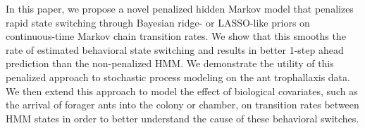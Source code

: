 \documentclass[ba]{imsart}
\begin{document}
In this paper, we propose a novel penalized hidden Markov model that penalizes rapid state switching through  Bayesian ridge- or LASSO-like priors on continuous-time Markov chain transition rates. We show that this smooths the rate of estimated behavioral state switching and results in better 1-step ahead prediction than the non-penalized HMM. We demonstrate the utility of this penalized approach to stochastic process modeling on the ant trophallaxis data. We then extend this approach to model the effect of biological covariates, such as the arrival of forager ants into the colony or chamber, on transition rates between HMM states in order to better understand the cause of these behavioral switches. 





\end{document}
